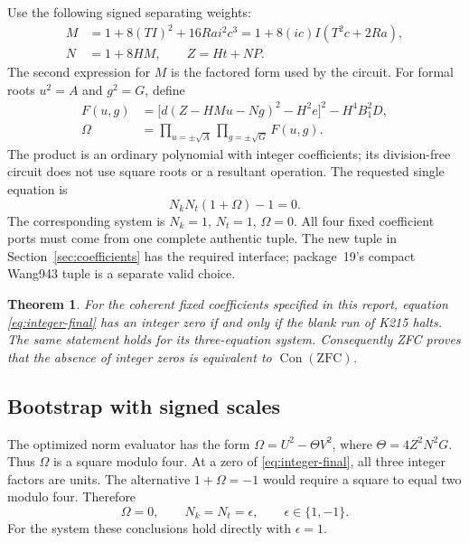 \documentclass[11pt,letterpaper]{article}
\newtheorem{theorem}{Theorem}[section]
\theoremstyle{remark}
\begin{document}
Use the following signed separating weights:
\begin{align}
 M&=1+8(TI)^2+16Ra i^2c^3
     =1+8(ic)I(T^2c+2Ra),\label{eq:signed-weight}\\
 N&=1+8HM,\qquad Z=Ht+NP.\label{eq:signed-weight-N}
\end{align}
The second expression for $M$ is the factored form used by the circuit.
For formal roots $u^2=A$ and $g^2=G$, define
\begin{align}
 F(u,g)&=\bigl[d(Z-HMu-Ng)^2-H^2e\bigr]^2-H^4B_1^2D,
 \label{eq:signed-factor}\\
 \Omega&=\prod_{u=\pm\sqrt A}\prod_{g=\pm\sqrt G}F(u,g).
 \label{eq:signed-norm}
\end{align}
The product is an ordinary polynomial with integer coefficients; its
division-free circuit does not use square roots or a resultant operation.
The requested single equation is
\begin{equation}\label{eq:integer-final}
 \boxed{\;N_kN_t(1+\Omega)-1=0.\;}
\end{equation}
The corresponding system is $N_k=1$, $N_t=1$, $\Omega=0$.
All four fixed coefficient ports must come from one complete authentic
tuple. The new tuple in Section~\ref{sec:coefficients} has the required
interface; package~19's compact Wang943 tuple is a separate valid choice.

\begin{theorem}\label{thm:integer24}
For the coherent fixed coefficients specified in this report, equation
\eqref{eq:integer-final} has an integer zero if and only if the blank
run of K215 halts. The same statement holds for its three-equation system.
Consequently ZFC proves that the absence of integer zeros is equivalent
to $\operatorname{Con}(\mathrm{ZFC})$.
\end{theorem}

\subsection{Bootstrap with signed scales}

The optimized norm evaluator has the form
$\Omega=U^2-\Theta V^2$, where
$\Theta=4Z^2N^2G$. Thus $\Omega$ is a square modulo four.
At a zero of \eqref{eq:integer-final}, all three integer factors are
units. The alternative $1+\Omega=-1$ would require a square to equal
two modulo four. Therefore
\[
 \Omega=0,\qquad N_k=N_t=\epsilon,\qquad\epsilon\in\{1,-1\}.
\]
For the system these conclusions hold directly with $\epsilon=1$.
\end{document}
